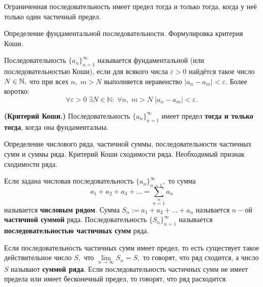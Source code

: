 \begin{theorem}
	Ограниченная последовательность имеет предел
	тогда и только тогда, когда у неё только
	один частичный предел.
\end{theorem}

\newpage
\begin{problem}
Определение фундаментальной последовательности. Формулировка критерия Коши.
\end{problem}
\begin{definition}
	Последовательность
	$\{a_n\}_{n=1}^{\infty}$
	называется фундаментальной
	(или последовательностью Коши),
	если для всякого числа $\varepsilon>0$
	найдётся такое число
	$N\in\mathbb{N},$ что при всех
	$n,\;m>N$ выполняется неравенство
	$|a_n-a_m|<\varepsilon.$
	Более коротко:
	$$
		\forall\varepsilon>0\;\exists
		N\in\mathbb{N}:\;\forall
		n,\;m>N\;
		|a_n-a_m|<\varepsilon.
	$$
\end{definition}

\begin{theorem} \textbf{(Критерий Коши.)}
	Последовательность $\{a_n\}_{n=1}^{\infty}$
	имеет предел \textbf{тогда и только
		тогда}, когда она фундаментальна.
\end{theorem}


\newpage
\begin{problem}
Определение числового ряда, частичной суммы, последовательности частичных сумм
и суммы ряда. Критерий Коши сходимости ряда. Необходимый признак сходимости ряда.
\end{problem}

\begin{definition}
	Если задана числовая последовательность
	$\{a_n\}_{n=1}^{\infty},$ то сумма
	$$a_1+a_2+a_3+...=\sum\limits_{n=1}\limits^{\infty}a_n$$
	называется \textbf{числовым рядом}.
	Сумма $S_n:=a_1+a_2+...+a_n$
	называется $n-$ой \textbf{частичной суммой} ряда.
	Последовательность $\{S_n\}_{n=1}^{\infty}$
	называется \textbf{последовательностью частичных
		сумм} ряда.
\end{definition}

\begin{definition}
	Если последовательность частичных
	сумм имеет предел, то есть существует такое
	действительное число $S,$ что
	$\lim\limits_{n\rightarrow\infty}S_n=S,$
	то говорят, что ряд сходится, а
	число $S$ называют \textbf{суммой ряда}.
	Если последовательность частичных сумм
	не имеет предела или имеет бесконечный
	предел, то говорят, что ряд расходится.
\end{definition}

